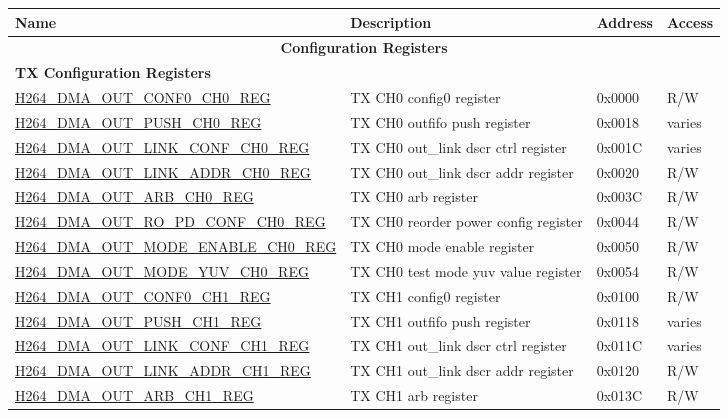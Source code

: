 \begin{longtable}{ | p{7.5cm} | p{5.7cm} | p{1.2cm} | p{1.5cm} | }
\hline\rowcolor{lightgray}
{\bfseries Name} & {\bfseries Description} &  {\bfseries Address} & {\bfseries Access} \\ \hline
\endhead
\multicolumn{4}{|c|}{\cellcolor{gray!15}\textbf{Configuration Registers}} \\ \hline
\multicolumn{4}{|l|}{\textbf{TX Configuration Registers}} \\ \hline
\hyperref[regdesc:H264DMAOUTCONF0CH0REG]{H264\_DMA\_OUT\_CONF0\_CH0\_REG} & TX CH0 config0 register & 0x0000 & R/W \\ \hline
\hyperref[regdesc:H264DMAOUTPUSHCH0REG]{H264\_DMA\_OUT\_PUSH\_CH0\_REG} & TX CH0 outfifo push register & 0x0018 & varies \\ \hline
\hyperref[regdesc:H264DMAOUTLINKCONFCH0REG]{H264\_DMA\_OUT\_LINK\_CONF\_CH0\_REG} & TX CH0 out\_link dscr ctrl register & 0x001C & varies \\ \hline
\hyperref[regdesc:H264DMAOUTLINKADDRCH0REG]{H264\_DMA\_OUT\_LINK\_ADDR\_CH0\_REG} & TX CH0 out\_link dscr addr register & 0x0020 & R/W \\ \hline
\hyperref[regdesc:H264DMAOUTARBCH0REG]{H264\_DMA\_OUT\_ARB\_CH0\_REG} & TX CH0 arb register & 0x003C & R/W \\ \hline
\hyperref[regdesc:H264DMAOUTROPDCONFCH0REG]{H264\_DMA\_OUT\_RO\_PD\_CONF\_CH0\_REG} & TX CH0 reorder power config register & 0x0044 & R/W \\ \hline
\hyperref[regdesc:H264DMAOUTMODEENABLECH0REG]{H264\_DMA\_OUT\_MODE\_ENABLE\_CH0\_REG} & TX  CH0 mode enable register & 0x0050 & R/W \\ \hline
\hyperref[regdesc:H264DMAOUTMODEYUVCH0REG]{H264\_DMA\_OUT\_MODE\_YUV\_CH0\_REG} & TX  CH0 test mode yuv value register & 0x0054 & R/W \\ \hline

\hyperref[regdesc:H264DMAOUTCONF0CH1REG]{H264\_DMA\_OUT\_CONF0\_CH1\_REG} & TX CH1 config0 register & 0x0100 & R/W \\ \hline
\hyperref[regdesc:H264DMAOUTPUSHCH1REG]{H264\_DMA\_OUT\_PUSH\_CH1\_REG} & TX CH1 outfifo push register & 0x0118 & varies \\ \hline
\hyperref[regdesc:H264DMAOUTLINKCONFCH1REG]{H264\_DMA\_OUT\_LINK\_CONF\_CH1\_REG} & TX CH1 out\_link dscr ctrl register & 0x011C & varies \\ \hline
\hyperref[regdesc:H264DMAOUTLINKADDRCH1REG]{H264\_DMA\_OUT\_LINK\_ADDR\_CH1\_REG} & TX CH1 out\_link dscr addr register & 0x0120 & R/W \\ \hline
\hyperref[regdesc:H264DMAOUTARBCH1REG]{H264\_DMA\_OUT\_ARB\_CH1\_REG} & TX CH1 arb register & 0x013C & R/W \\ \hline


\end{longtable}

